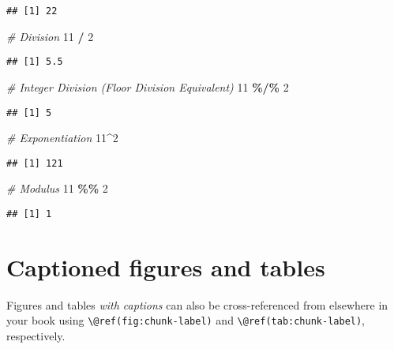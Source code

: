 \documentclass[
]{book}
\newenvironment{Shaded}{\begin{snugshade}}{\end{snugshade}}
\newcommand{\CommentTok}[1]{\textcolor[rgb]{0.56,0.35,0.01}{\textit{#1}}}
\newcommand{\DecValTok}[1]{\textcolor[rgb]{0.00,0.00,0.81}{#1}}
\newcommand{\SpecialCharTok}[1]{\textcolor[rgb]{0.81,0.36,0.00}{\textbf{#1}}}
\begin{document}
\begin{verbatim}
## [1] 22
\end{verbatim}

\begin{Shaded}
\begin{Highlighting}[]
\CommentTok{\# Division}
\DecValTok{11} \SpecialCharTok{/} \DecValTok{2}
\end{Highlighting}
\end{Shaded}

\begin{verbatim}
## [1] 5.5
\end{verbatim}

\begin{Shaded}
\begin{Highlighting}[]
\CommentTok{\# Integer Division (Floor Division Equivalent)}
\DecValTok{11} \SpecialCharTok{\%/\%} \DecValTok{2}
\end{Highlighting}
\end{Shaded}

\begin{verbatim}
## [1] 5
\end{verbatim}

\begin{Shaded}
\begin{Highlighting}[]
\CommentTok{\# Exponentiation}
\DecValTok{11}\SpecialCharTok{\^{}}\DecValTok{2}
\end{Highlighting}
\end{Shaded}

\begin{verbatim}
## [1] 121
\end{verbatim}

\begin{Shaded}
\begin{Highlighting}[]
\CommentTok{\# Modulus}
\DecValTok{11} \SpecialCharTok{\%\%} \DecValTok{2}
\end{Highlighting}
\end{Shaded}

\begin{verbatim}
## [1] 1
\end{verbatim}

\hypertarget{captioned-figures-and-tables}{%
\section{Captioned figures and
tables}\label{captioned-figures-and-tables}}

Figures and tables \emph{with captions} can also be cross-referenced
from elsewhere in your book using
\texttt{\textbackslash{}@ref(fig:chunk-label)} and
\texttt{\textbackslash{}@ref(tab:chunk-label)}, respectively.
\end{document}
